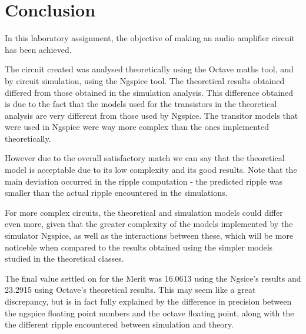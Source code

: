 \section{Conclusion}
\label{sec:conclusion}

In this laboratory assignment, the objective of making an audio amplifier circuit has been achieved.\par
The circuit created was analysed theoretically using the Octave maths tool, and by circuit simulation, using the
Ngspice tool. The theoretical results obtained differed from those obtained in the simulation analysis. This difference obtained is due to the fact that the models used for the transistors in the theoretical analysis are very different from those used by Ngspice. The transitor models that were used in Ngspice were way more complex than the ones implemented theoretically. 

However due to the overall satisfactory match we can say that the theoretical model is acceptable due to its low complexity and its good results. Note that the main deviation occurred in the ripple computation - the predicted ripple was smaller than the actual ripple encountered in the simulations.\par
 For more complex circuits, the
theoretical and simulation models could differ even more, given that the greater complexity of the models implemented by the simulator Ngspice, as well as the interactions between these, which will be more noticeble when compared to the results obtained using the simpler models studied in the theoretical classes.\par
The final value settled on for the Merit was 16.0613 using the Ngsice's results and 23.2915 using Octave's theoretical results. This may seem like a great discrepancy, but is in fact fully explained by the difference in precision between the ngspice floating point numbers and the octave floating point, along with the the different ripple encountered between simulation and theory.

